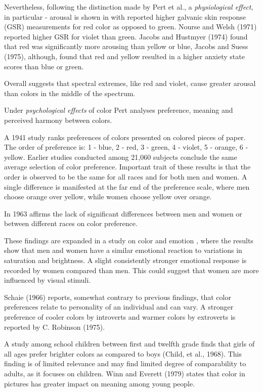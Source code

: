 		Nevertheless, following the distinction made by Pert et al., a \textit{physiological effect}, in particular - arousal is shown in \cite{Wilson1966} with reported higher galvanic skin response (GSR) measurements for red color as opposed to green. 
		Nourse and Welsh (1971) reported higher GSR for violet than green.
		Jacobs and Hustmyer (1974) found that red was significantly more arousing than yellow or blue, 
		Jacobs and Suess (1975), although, found that red and yellow resulted in a higher anxiety state scores than blue or green.
		
		Overall \cite{Pert1996} suggests that spectral extremes, like red and violet, cause greater arousal than colors in the middle of the spectrum.
		
		Under \textit{psychological effects} of color Pert analyses preference, meaning and perceived harmony between colors.
		
		A 1941 study \cite{Eysenck1941} ranks preferences of colors presented on colored pieces of paper. 
		The order of preference is: 1 - blue, 2 - red, 3 - green, 4 - violet, 5 - orange, 6 - yellow. Earlier studies conducted among 21,060 subjects conclude the same average selection of color preference. Important trait of these results is that the order is observed to be the same for all races and for both men and women. A single difference is manifested at the far end of the preference scale, where men choose orange over yellow, while women choose yellow over orange.
		
		In 1963 \cite{burnham1963color} affirms the lack of significant differences between men and women or between different races on color preference.
		
		These findings are expanded in a study on color and emotion \cite{Valdez1994}, where the results show that men and women have a similar emotional reaction to variations in saturation and brightness. A slight consistently stronger emotional response is recorded by women compared than men. This could suggest that women are more influenced by visual stimuli.
		
		Schaie (1966) reports, somewhat contrary to previous findings, that color preferences relate to personality of an individual and can vary. A stronger preference of cooler colors by introverts and warmer colors by extroverts is reported by C. Robinson (1975).
		
		A study among school children between first and twelfth grade finds that girls of all ages prefer brighter colors as compared to boys (Child, et al., 1968). This finding is of limited relevance and may find limited degree of comparability to adults, as it focuses on children. Winn and Everett (1979) states that color in pictures has greater impact on meaning among young people.
				
